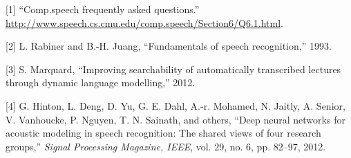 {[}1{]} ``Comp.speech frequently asked questions.''
\url{http://www.speech.cs.cmu.edu/comp.speech/Section6/Q6.1.html}.

{[}2{]} L. Rabiner and B.-H. Juang, ``Fundamentals of speech
recognition,'' 1993.

{[}3{]} S. Marquard, ``Improving searchability of automatically
transcribed lectures through dynamic language modelling,'' 2012.

{[}4{]} G. Hinton, L. Deng, D. Yu, G. E. Dahl, A.-r. Mohamed, N. Jaitly,
A. Senior, V. Vanhoucke, P. Nguyen, T. N. Sainath, and others, ``Deep
neural networks for acoustic modeling in speech recognition: The shared
views of four research groups,'' \emph{Signal Processing Magazine,
IEEE}, vol. 29, no. 6, pp. 82--97, 2012.
